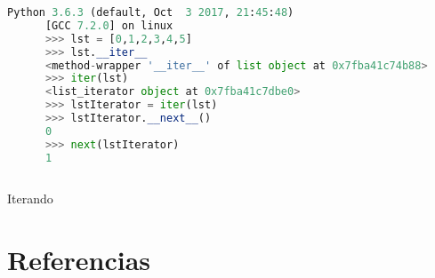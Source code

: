 \documentclass[spanish]{beamer}
\begin{document}
  \begin{frame}[fragile]
    
    \begin{lstlisting}[language=Python,keywordstyle=\bf,stringstyle=\it]
      Python 3.6.3 (default, Oct  3 2017, 21:45:48) 
      [GCC 7.2.0] on linux
      >>> lst = [0,1,2,3,4,5]
      >>> lst.__iter__
      <method-wrapper '__iter__' of list object at 0x7fba41c74b88>
      >>> iter(lst)
      <list_iterator object at 0x7fba41c7dbe0>
      >>> lstIterator = iter(lst)
      >>> lstIterator.__next__()
      0
      >>> next(lstIterator)
      1
      
    \end{lstlisting}
    
  \end{frame}

  \begin{frame}{Iterando}
    
  \end{frame}
  
  \section{Referencias}

\end{document}
